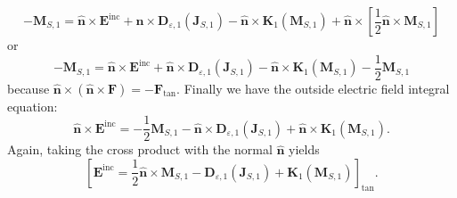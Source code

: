 \documentclass[a4paper,10pt]{book}
\newcommand{\field}[1]{\mathbf{#1}}
\newcommand{\current}[1]{\mathbf{#1}}
\newcommand{\vect}[1]{\mathbf{#1}}
\newcommand{\operator}[1]{\mathbf{#1}}
\begin{document}
\begin{equation}
-\current{M}_{S,1} = \vect{\hat{n}}\times \field{E}^\text{inc} + \vect{\hat{n}}\times \operator{D}_{\varepsilon, 1}\left(\current{J}_{S,1}\right) - \vect{\hat{n}}\times \operator{K}_{1}\left(\current{M}_{S,1}\right) + \vect{\hat{n}}\times \left[\frac{1}{2}\vect{\hat{n}}\times \current{M}_{S,1}\right]
\end{equation}
or
\begin{equation}
-\current{M}_{S,1} = \vect{\hat{n}}\times \field{E}^\text{inc} + \vect{\hat{n}}\times \operator{D}_{\varepsilon, 1}\left(\current{J}_{S,1}\right) - \vect{\hat{n}}\times \operator{K}_{1}\left(\current{M}_{S,1}\right) -  \frac{1}{2}\current{M}_{S,1}
\end{equation}
because $\vect{\hat{n}} \times \left(\vect{\hat{n}} \times \current{F} \right) = -\current{F}_\text{tan}$. Finally we have the outside electric field integral equation:
\begin{equation}
\boxed{
\vect{\hat{n}}\times \field{E}^\text{inc} =  -  \frac{1}{2}\current{M}_{S,1} - \vect{\hat{n}}\times \operator{D}_{\varepsilon, 1}\left(\current{J}_{S,1}\right) + \vect{\hat{n}}\times \operator{K}_{1}\left(\current{M}_{S,1}\right) }.
\end{equation}
Again, taking the cross product with the normal $\vect{\hat{n}}$ yields
\begin{equation}
\boxed{
\left[\field{E}^\text{inc} =  \frac{1}{2}\vect{\hat{n}}\times \current{M}_{S,1} - \operator{D}_{\varepsilon, 1}\left(\current{J}_{S,1}\right) + \operator{K}_{1}\left(\current{M}_{S,1}\right) \right]_\text{tan} }.
\end{equation}
\end{document}
